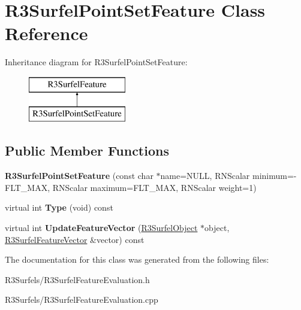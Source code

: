 \hypertarget{class_r3_surfel_point_set_feature}{}\section{R3\+Surfel\+Point\+Set\+Feature Class Reference}
\label{class_r3_surfel_point_set_feature}
Inheritance diagram for R3\+Surfel\+Point\+Set\+Feature\+:\begin{figure}[H]
\begin{center}
\leavevmode
\includegraphics[height=2.000000cm]{class_r3_surfel_point_set_feature}
\end{center}
\end{figure}
\subsection*{Public Member Functions}
\begin{DoxyCompactItemize}
\item 
{\bfseries R3\+Surfel\+Point\+Set\+Feature} (const char $\ast$name=N\+U\+LL, R\+N\+Scalar minimum=-\/F\+L\+T\+\_\+\+M\+AX, R\+N\+Scalar maximum=F\+L\+T\+\_\+\+M\+AX, R\+N\+Scalar weight=1)\hypertarget{class_r3_surfel_point_set_feature_a60df541a802fa347dd86550fd08f2557}{}\label{class_r3_surfel_point_set_feature_a60df541a802fa347dd86550fd08f2557}

\item 
virtual int {\bfseries Type} (void) const \hypertarget{class_r3_surfel_point_set_feature_a888df9bb9dfaea2ece0210517b88a820}{}\label{class_r3_surfel_point_set_feature_a888df9bb9dfaea2ece0210517b88a820}

\item 
virtual int {\bfseries Update\+Feature\+Vector} (\hyperlink{class_r3_surfel_object}{R3\+Surfel\+Object} $\ast$object, \hyperlink{class_r3_surfel_feature_vector}{R3\+Surfel\+Feature\+Vector} \&vector) const \hypertarget{class_r3_surfel_point_set_feature_ac605bd460cc29497ac1790e93c6cbb98}{}\label{class_r3_surfel_point_set_feature_ac605bd460cc29497ac1790e93c6cbb98}

\end{DoxyCompactItemize}


The documentation for this class was generated from the following files\+:\begin{DoxyCompactItemize}
\item 
R3\+Surfels/R3\+Surfel\+Feature\+Evaluation.\+h\item 
R3\+Surfels/R3\+Surfel\+Feature\+Evaluation.\+cpp\end{DoxyCompactItemize}
